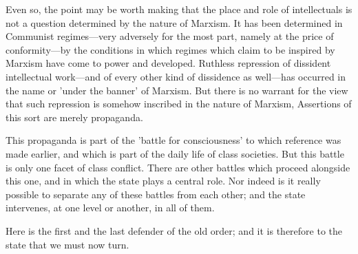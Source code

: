 Even so, the point may be worth making that the place and role of intellectuals is not a question determined by the nature of Marxism. It has been determined in Communist regimes—very adversely for the most part, namely at the price of conformity—by the conditions in which regimes which claim to be inspired by Marxism have come to power and developed. Ruthless repression of dissident intellectual work—and of every other kind of dissidence as well—has occurred in the name or 'under the banner' of Marxism. But there is no warrant for the view that such repression is somehow inscribed in the nature of Marxism, Assertions of this sort are merely propaganda.

This propaganda is part of the 'battle for consciousness' to which reference was made earlier, and which is part of the daily life of class societies. But this battle is only one facet of class conflict. There are other battles which proceed alongside this one, and in which the state plays a central role. Nor indeed is it really possible to separate any of these battles from each other; and the state intervenes, at one level or another, in all of them.

 Here is the first and the last defender of the old order; and it is therefore to the state that we must now turn.

